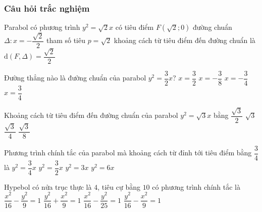 \subsubsection{Câu hỏi trắc nghiệm}
\begin{ex}
	Parabol có phương trình $y^2=\sqrt{2}x$ có
	\choice
	{tiêu điểm $F(\sqrt{2};0)$}
	{đường chuẩn $\Delta\colon x=-\dfrac{\sqrt{2}}{2}$}
	{tham số tiêu $p=\sqrt{2}$}
	{\True khoảng cách từ tiêu điểm đến đường chuẩn là $\mathrm{d}(F,\Delta)=\dfrac{\sqrt{2}}{2}$}
\end{ex}
\begin{ex}
	Đường thẳng nào là đường chuẩn của parabol $y^2=\dfrac{3}{2}x$?
	\choice
	{$x=\dfrac{3}{2}$}
	{\True $x=-\dfrac{3}{8}$}
	{$x=-\dfrac{3}{4}$}
	{$x=\dfrac{3}{4}$}
\end{ex}
\begin{ex}
	Khoảng cách từ tiêu điểm đến đường chuẩn của parabol $y^2=\sqrt{3}x$ bằng
	\choice
	{\True $\dfrac{\sqrt{3}}{2}$}
	{$\sqrt{3}$}
	{$\dfrac{\sqrt{3}}{4}$}
	{$\dfrac{\sqrt{3}}{8}$}
\end{ex}
\begin{ex}
	Phương trình chính tắc của parabol mà khoảng cách từ đỉnh tới tiêu điểm bằng $\dfrac{3}{4}$ là
	\choice
	{$y^2=\dfrac{3}{4}x$}
	{$y^2=\dfrac{3}{2}x$}
	{\True $y^2=3x$}
	{$y^2=6x$}
\end{ex}

\begin{ex}%
	Hypebol có nửa trục thực là $4$, tiêu cự bằng $10$ có phương trình chính tắc là
	\choice
	{\True $\dfrac{x^2}{16}-\dfrac{y^2}{9}=1$}
	{$\dfrac{y^2}{16}+\dfrac{x^2}{9}=1$}
	{$\dfrac{x^2}{16}-\dfrac{y^2}{25}=1$}
	{$\dfrac{y^2}{16}-\dfrac{x^2}{9}=1$}
\end{ex}

